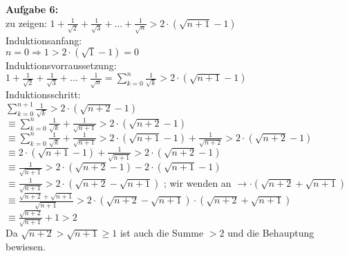 \documentclass[a4paper]{scrartcl}
\begin{document}
	\begin{flushleft}
		\textbf{Aufgabe 6:}\\	
		zu zeigen: $1 + \frac{1}{\sqrt{2}} + \frac{1}{\sqrt{3}} + \dots + \frac{1}{\sqrt{n}}> 2\cdot(\sqrt{n+1} -1)$\\[1em]
		Induktionsanfang:\\
		$n=0\Rightarrow 1 > 2\cdot(\sqrt{1} -1) = 0$\\[1em]
		Induktionsvorraussetzung:\\
		$1 + \frac{1}{\sqrt{2}} + \frac{1}{\sqrt{3}} + \dots + \frac{1}{\sqrt{n}}= \sum\limits_{k=0}^{n}\frac{1}{\sqrt{k}}> 2\cdot(\sqrt{n+1} -1)$\\[1em]
		Induktionsschritt:\\
		$\sum\limits_{k=0}^{n+1}\frac{1}{\sqrt{k}}> 2\cdot(\sqrt{n+2} -1)$\\
		$\equiv \sum\limits_{k=0}^{n}\frac{1}{\sqrt{k}} + \frac{1}{\sqrt{n+1}}> 2\cdot(\sqrt{n+2} -1)$\\
		$\equiv \sum\limits_{k=0}^{n}\frac{1}{\sqrt{k}} + \frac{1}{\sqrt{n+1}}> 2\cdot(\sqrt{n+1} -1) + \frac{1}{\sqrt{n+2}} > 2\cdot(\sqrt{n+2} -1)$\\
		$\equiv 2\cdot(\sqrt{n+1} -1) + \frac{1}{\sqrt{n+1}} > 2\cdot(\sqrt{n+2} -1)$\\
		$\equiv \frac{1}{\sqrt{n+1}} > 2\cdot(\sqrt{n+2} -1) - 2\cdot(\sqrt{n+1} -1)$\\
		$\equiv \frac{1}{\sqrt{n+1}} > 2\cdot(\sqrt{n+2}-\sqrt{n+1})$             ; wir wenden an $\rightarrow \cdot (\sqrt{n+2}+\sqrt{n+1})$\\
		$\equiv \frac{\sqrt{n+2}+\sqrt{n+1}}{\sqrt{n+1}} > 2\cdot(\sqrt{n+2}-\sqrt{n+1})\cdot(\sqrt{n+2}+\sqrt{n+1})$\\ 
		$\equiv \frac{\sqrt{n+2}}{\sqrt{n+1}}+1 > 2$\\ 
		Da $\sqrt{n+2}>\sqrt{n+1}\geq 1$ ist auch die Summe $>2$ und die Behauptung bewiesen.\\[1em]
	\end{flushleft}
\end{document}
